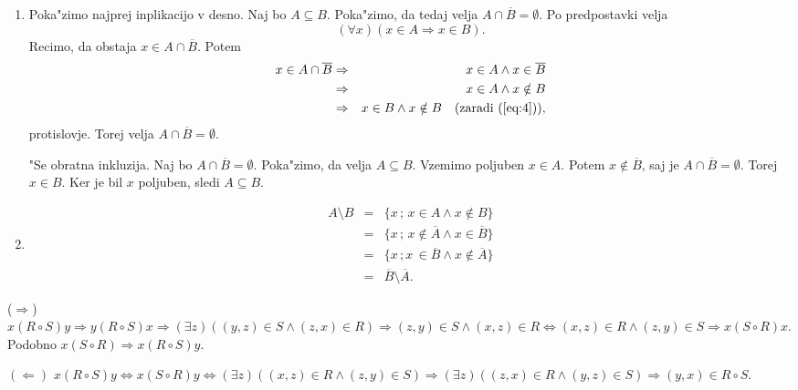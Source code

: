 \begin{answer}{2.14}
    \begin{enumerate}
\item Poka"zimo najprej inplikacijo v desno. Naj bo $A\subseteq B$. Poka"zimo, da tedaj velja $A\cap \overline{B} = \emptyset$. Po predpostavki velja
\begin{equation}\label{eq:4}
(\forall x)(x\in A \Rightarrow x\in B).
\end{equation}
Recimo, da obstaja $x\in A\cap \overline{B}$. Potem
\begin{eqnarray*}
x\in A\cap \overline{B} &\Rightarrow & x\in A \wedge x\in \overline{B}\\
						&\Rightarrow & x\in A \wedge x \notin B\\
						&\Rightarrow & x\in B \wedge x \notin B \quad (\textrm{zaradi } (\ref{eq:4})),
\end{eqnarray*}
protislovje. Torej velja $A\cap \overline{B}=\emptyset$.

"Se obratna inkluzija. Naj bo $A\cap \overline{B}=\emptyset$. Poka"zimo, da velja $A\subseteq B$. Vzemimo poljuben $x\in A$. Potem $x\notin \overline{B}$, saj je $A\cap \overline{B}=\emptyset$. Torej $x\in B$. Ker je bil $x$ poljuben, sledi $A\subseteq B$.


\item
\begin{eqnarray*}
A\setminus B & = & \{x\, ;\, x\in A \wedge x\notin B \}\\
             & = & \{x\, ;\, x\notin \overline{A} \wedge x  \in \overline{B} \}\\
             & = & \{x\, ; x\,  \in \overline{B} \wedge  x\notin \overline{A} \}\\
             & = & \overline{B} \setminus \overline{A}.
\end{eqnarray*}

\end{enumerate}

\end{answer}
\begin{answer}{3.6}
     ($\Rightarrow$) $x(R\circ S)y \Rightarrow y(R\circ S)x \Rightarrow (\exists z) ((y,z)\in S \wedge (z,x)\in R) \Rightarrow (z,y)\in S \wedge (x,z)\in R \Leftrightarrow (x,z)\in R \wedge (z,y)\in S \Rightarrow x(S\circ R)x$. Podobno $x(S\circ R) \Rightarrow x(R\circ S)y$.

$(\Leftarrow)$ $x(R\circ S)y \Leftrightarrow x(S\circ R)y \Leftrightarrow (\exists z)((x,z)\in R \wedge (z,y)\in S)\Rightarrow (\exists z)((z,x)\in R \wedge (y,z)\in S)\Rightarrow (y,x) \in R\circ S$.

\end{answer}
